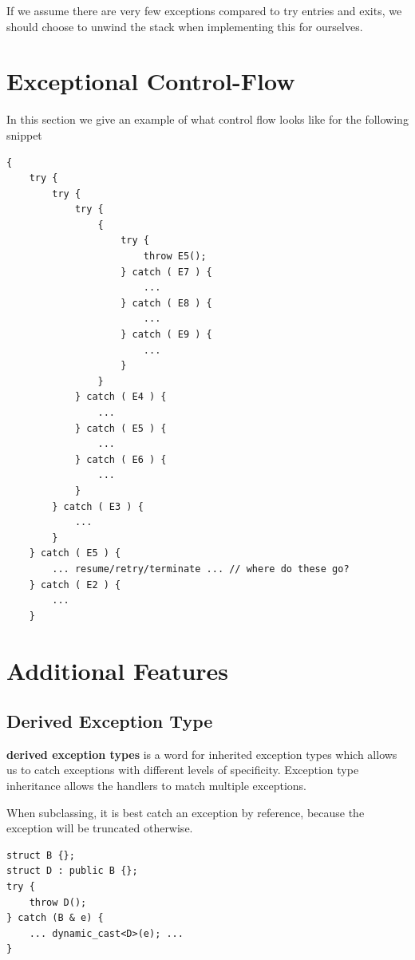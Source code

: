             If we assume there are very few exceptions compared to try entries and exits, we should choose to unwind the stack when implementing this for ourselves.

        \section{Exceptional Control-Flow} %
        \label{sec:exceptional_control_flow}
            In this section we give an example of what control flow looks like for the following snippet
                \begin{lstlisting}
{
    try {
        try {
            try {
                {
                    try {
                        throw E5();
                    } catch ( E7 ) {
                        ...
                    } catch ( E8 ) {
                        ...
                    } catch ( E9 ) {
                        ...
                    }
                }
            } catch ( E4 ) {
                ...
            } catch ( E5 ) {
                ...
            } catch ( E6 ) {
                ...
            }
        } catch ( E3 ) {
            ...
        }
    } catch ( E5 ) {
        ... resume/retry/terminate ... // where do these go?
    } catch ( E2 ) {
        ...
    }
                \end{lstlisting}
        \section{Additional Features} %
        \label{sec:additional_features}
            \subsection{Derived Exception Type} %
            \label{sub:derived_exception_type}
                \textbf{derived exception types} is a word for inherited exception types which allows us to catch exceptions with different levels of specificity.
                Exception type inheritance allows the handlers to match multiple exceptions.

                When subclassing, it is best catch an exception by reference, because the exception will be truncated otherwise.
                \begin{lstlisting}
struct B {};
struct D : public B {};
try {
    throw D();
} catch (B & e) {
    ... dynamic_cast<D>(e); ...
}
                \end{lstlisting}

